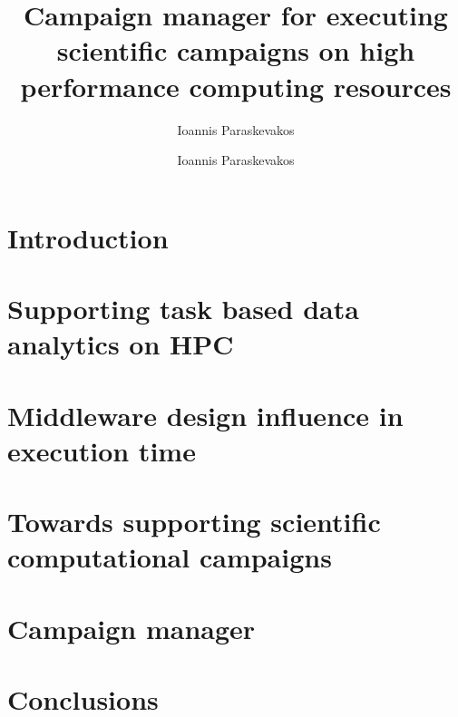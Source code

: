 \documentclass{ruthesis}
\begin{document}
\author{Ioannis Paraskevakos}
\copyrightp
\title{Campaign manager for executing scientific campaigns on high performance computing resources}
\author{Ioannis Paraskevakos}					
\figurespage
\tablespage

\abstract{}
\acknowledgements{}

\beforepreface
\afterpreface

\chapter{Introduction}


\chapter{Supporting task based data analytics on HPC}


\chapter{Middleware design influence in execution time}


\chapter{Towards supporting scientific computational campaigns}


\chapter{Campaign manager}


\chapter{Conclusions}




\end{document}
